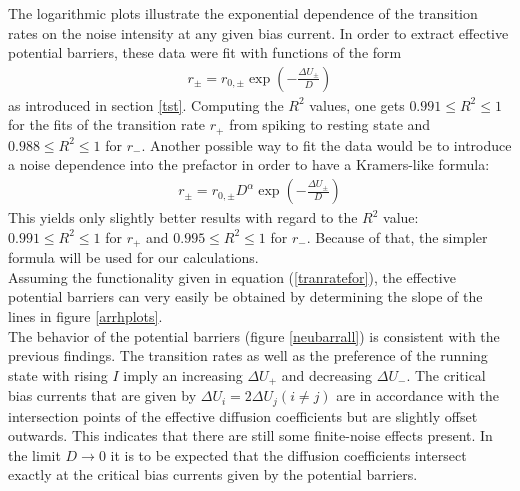 \documentclass[12pt,a4paper]{article}
\begin{document}
The logarithmic plots illustrate the exponential dependence of the transition rates on the noise intensity at any given bias current. In order to extract effective potential barriers, these data were fit with functions of the form
\begin{align}\label{tranratefor}
r_{\pm}=r_{0,\pm}\exp\left(-\frac{\Delta U_{\pm}}{D}\right)
\end{align}
as introduced in section \ref{tst}. Computing the $R^2$ values, one gets $0.991\leq R^2\leq1$ for the fits of the transition rate $r_+$ from spiking to resting state and $0.988\leq R^2\leq1$ for $r_-$.
Another possible way to fit the data would be to introduce a noise dependence into the prefactor in order to have a Kramers-like formula:
\begin{align*}
r_{\pm}=r_{0,\pm}D^\alpha\exp\left(-\frac{\Delta U_{\pm}}{D}\right)
\end{align*}
This yields only slightly better results with regard to the $R^2$ value: $0.991\leq R^2\leq1$ for $r_+$ and $0.995\leq R^2\leq1$ for $r_-$. Because of that, the simpler formula will be used for our calculations.\\
Assuming the functionality given in equation (\ref{tranratefor}), the effective potential barriers can very easily be obtained by determining the slope of the lines in figure \ref{arrhplots}.\\
The behavior of the potential barriers (figure \ref{neubarrall}) is consistent with the previous findings. The transition rates as well as the preference of the running state with rising $I$ imply an increasing $\Delta U_+$ and decreasing $\Delta U_-$. The critical bias currents that are given by $\Delta U_i=2\Delta U_j (i\neq j)$ are in accordance with the intersection points of the effective diffusion coefficients but are slightly offset outwards. This indicates that there are still some finite-noise effects present. In the limit $D\rightarrow 0$ it is to be expected that the diffusion coefficients intersect exactly at the critical bias currents given by the potential barriers.
\end{document}
